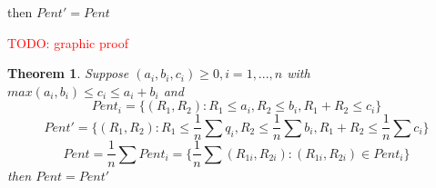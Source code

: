 \documentclass[twoside]{article}
\newtheorem{theorem}{Theorem}[section]
\theoremstyle{definition} %
\newcommand{\todo}[1]{\textcolor{red}{TODO: #1}}
\begin{document}
\begin{appendices}
then $Pent' = Pent$

\todo{graphic proof}

\begin{theorem}
  Suppose $(a_i, b_i, c_i) \geq 0, i = 1 , ..., n$ with $max(a_i, b_i) \leq c_i \leq a_i + b_i$ and
  \[
    Pent_i = \{(R_1, R_2): R_1 \leq a_i, R_2 \leq b_i, R_1 + R_2 \leq c_i \}
  \]
  \[
    Pent' = \{(R_1, R_2): R_1 \leq \frac{1}{n} \sum q_i , R_2 \leq \frac{1}{n} \sum b_i, R_1 + R_2 \leq \frac{1}{n} \sum c_i \}
  \]
  \[
    Pent = \frac{1}{n} \sum Pent_i = \{\frac{1}{n} \sum (R_{1i}, R_{2i}) : (R_{1i}, R_{2i}) \in Pent_i \}
  \]
  then $Pent = Pent'$
\end{theorem}

\end{appendices}
\end{document}

